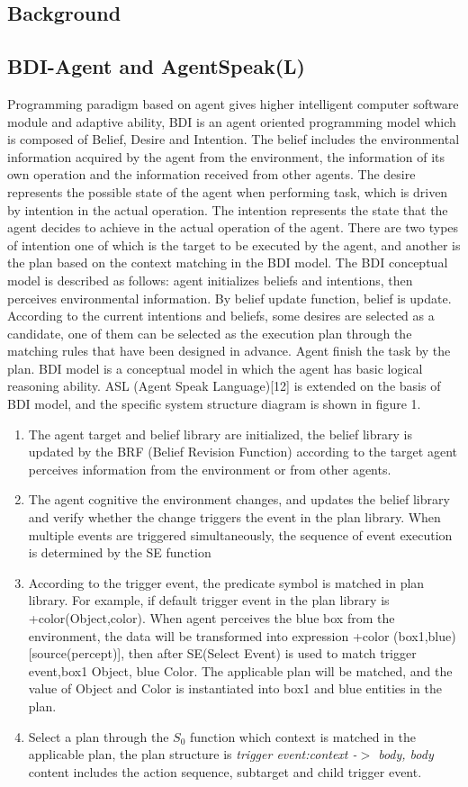 \documentclass{article}
\begin{document}
\begin{multicols}{2}
\section{Background}
\subsection{ BDI-Agent and AgentSpeak(L)}
Programming paradigm based on agent gives higher intelligent
computer software module and adaptive ability, BDI is an agent
oriented programming model which is composed of Belief, Desire
and Intention. The belief includes the environmental information
acquired by the agent from the environment, the information of its
own operation and the information received from other agents.
The desire represents the possible state of the agent when
performing task, which is driven by intention in the actual
operation. The intention represents the state that the agent decides
to achieve in the actual operation of the agent. There are two types
of intention one of which is the target to be executed by the agent,
and another is the plan based on the context matching in the BDI
model. The BDI conceptual model is described as follows: agent
initializes beliefs and intentions, then perceives environmental
information. By belief update function, belief is update.
According to the current intentions and beliefs, some desires are
selected as a candidate, one of them can be selected as the
execution plan through the matching rules that have been
designed in advance. Agent finish the task by the plan. BDI model
is a conceptual model in which the agent has basic logical
reasoning ability.
ASL (Agent Speak Language)[12] is extended on the basis of
BDI model, and the specific system structure diagram is shown
in figure 1.
\begin{enumerate}[1.]
    \item The agent target and belief library are initialized, the belief
library is updated by the BRF (Belief Revision Function)
according to the target agent perceives information from the
environment or from other agents.
    \item The agent cognitive the environment changes, and updates
the belief library and verify whether the change triggers the
event in the plan library. When multiple events are triggered
simultaneously, the sequence of event execution is
determined by the SE function
    \item According to the trigger event, the predicate symbol is
matched in plan library. For example, if default trigger
event in the plan library is +color(Object,color). When
agent perceives the blue box from the environment, the data
will be transformed into expression +color
(box1,blue)[source(percept)], then after SE(Select Event)
is used to match trigger event,box1 Object, blue
Color. The applicable plan will be matched, and the value of Object and Color is instantiated into box1 and blue entities
in the plan.
    \item Select a plan through the $S_0$ function which context is matched in the applicable plan, the plan structure is \textit{trigger event:context -$>$ body, body} content includes the action sequence, subtarget and child trigger event.


\end{enumerate}
\end{multicols}
\end{document}
